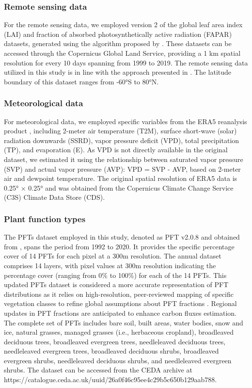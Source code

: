 \subsubsection*{Remote sensing data}
For the remote sensing data, we employed version 2 of the global leaf area index (LAI) and fraction of absorbed photosynthetically active radiation (FAPAR) datasets, generated using the algorithm proposed by \citep{verger2014near}. These datasets can be accessed through the Copernicus Global Land Service, providing a 1 km spatial resolution for every 10 days spanning from 1999 to 2019. The remote sensing data utilized in this study is in line with the approach presented in \citep{zeng2020global}. The latitude boundary of this dataset ranges from -60°S to 80°N. \par
\subsubsection*{Meteorological data}
For meteorological data, we employed specific variables from the ERA5 reanalysis product \citep{hersbach2020era5}, including 2-meter air temperature (T2M), surface short-wave (solar) radiation downwards (SSRD), vapor pressure deficit (VPD), total precipitation (TP), and evaporation (E). As VPD is not directly available in the original dataset, we estimated it using the relationship between saturated vapor pressure (SVP) and actual vapor pressure (AVP): VPD = SVP - AVP, based on 2-meter air and dewpoint temperature. The original spatial resolution of ERA5 data is 0.25° × 0.25° and was obtained from the Copernicus Climate Change Service (C3S) Climate Data Store (CDS). \par

\subsubsection*{Plant function types}
The PFTs dataset employed in this study, denoted as PFT v2.0.8 and obtained from \citep{harper202229}, spans the period from 1992 to 2020. It provides the specific percentage cover of 14 PFTs for each pixel at a 300m resolution. The annual dataset comprises 14 layers, with pixel values at 300m resolution indicating the percentage cover (ranging from 0\% to 100\%) for each of the 14 PFTs. This updated PFTs dataset is considered a more accurate representation of PFT distributions as it relies on high-resolution, peer-reviewed mapping of specific vegetation classes to refine global assumptions about PFT fractions \citep{harper202229}. Regional updates in PFT fractions are anticipated to enhance carbon fluxes estimation. The complete set of PFTs includes bare soil, built areas, water bodies, snow and ice, natural grasses, managed grasses (i.e., herbaceous cropland), broadleaved deciduous trees, broadleaved evergreen trees, needleleaved deciduous trees, needleleaved evergreen trees, broadleaved deciduous shrubs, broadleaved evergreen shrubs, needleleaved deciduous shrubs, and needleleaved evergreen shrubs. The dataset can be accessed from the CEDA archive at https://catalogue.ceda.ac.uk/uuid/26a0f46c95ee4c29b5c650b129aab788.\par

